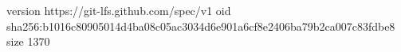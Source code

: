 version https://git-lfs.github.com/spec/v1
oid sha256:b1016c80905014d4ba08c05ac3034d6e901a6cf8e2406ba79b2ca007c83fdbe8
size 1370
